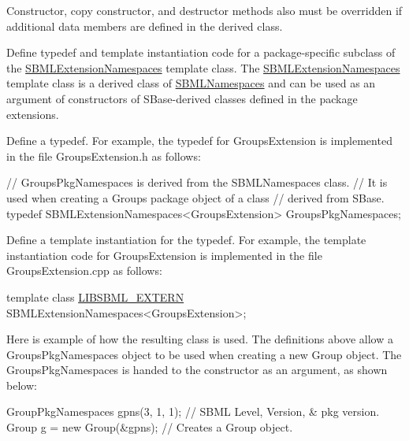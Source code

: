 Constructor, copy constructor, and destructor methods also must be overridden if additional data members are defined in the derived class.

Define typedef and template instantiation code for a package-\/specific subclass of the \hyperlink{class_s_b_m_l_extension_namespaces}{S\+B\+M\+L\+Extension\+Namespaces} template class. The \hyperlink{class_s_b_m_l_extension_namespaces}{S\+B\+M\+L\+Extension\+Namespaces} template class is a derived class of \hyperlink{class_s_b_m_l_namespaces}{S\+B\+M\+L\+Namespaces} and can be used as an argument of constructors of S\+Base-\/derived classes defined in the package extensions.


\begin{DoxyEnumerate}
\item Define a typedef. For example, the typedef for {\ttfamily Groups\+Extension} is implemented in the file {\ttfamily Groups\+Extension.\+h} as follows\+: 
\begin{DoxyCode}
\textcolor{comment}{// GroupsPkgNamespaces is derived from the SBMLNamespaces class.}
\textcolor{comment}{// It is used when creating a Groups package object of a class}
\textcolor{comment}{// derived from SBase.}
\textcolor{keyword}{typedef} SBMLExtensionNamespaces<GroupsExtension> GroupsPkgNamespaces;
\end{DoxyCode}
 


\item Define a template instantiation for the typedef. For example, the template instantiation code for {\ttfamily Groups\+Extension is} implemented in the file {\ttfamily Groups\+Extension.\+cpp} as follows\+: 
\begin{DoxyCode}
\textcolor{keyword}{template} \textcolor{keyword}{class }\hyperlink{extern_8h_a8e9e5118f0c55d410f8bc217f2954dbf}{LIBSBML\_EXTERN} SBMLExtensionNamespaces<GroupsExtension>;
\end{DoxyCode}
 


\end{DoxyEnumerate}

Here is example of how the resulting class is used. The definitions above allow a {\ttfamily Groups\+Pkg\+Namespaces} object to be used when creating a new {\ttfamily Group} object. The {\ttfamily Groups\+Pkg\+Namespaces} is handed to the constructor as an argument, as shown below\+: 
\begin{DoxyCode}
GroupPkgNamespaces gpns(3, 1, 1);  \textcolor{comment}{// SBML Level, Version, & pkg version.}
Group g = \textcolor{keyword}{new} Group(&gpns);        \textcolor{comment}{// Creates a Group object.}
\end{DoxyCode}


